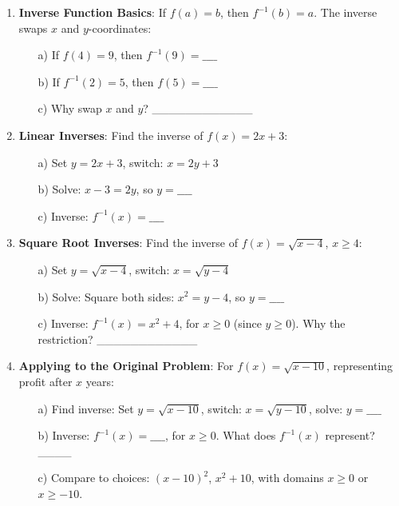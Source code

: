 \documentclass[12pt]{article}
\begin{document}
\begin{enumerate}[label=11.\arabic*]
    \item \textbf{Inverse Function Basics}: If \( f(a) = b \), then \( f^{-1}(b) = a \). The inverse swaps \( x \) and \( y \)-coordinates:
    \begin{enumerate}
        \item[a)] If \( f(4) = 9 \), then \( f^{-1}(9) = \_\_\_\_ \)
        \item[b)] If \( f^{-1}(2) = 5 \), then \( f(5) = \_\_\_\_ \)
        \item[c)] Why swap \( x \) and \( y \)? \_\_\_\_\_\_\_\_\_\_\_\_
    \end{enumerate}
    \item \textbf{Linear Inverses}: Find the inverse of \( f(x) = 2x + 3 \):
    \begin{enumerate}
        \item[a)] Set \( y = 2x + 3 \), switch: \( x = 2y + 3 \)
        \item[b)] Solve: \( x - 3 = 2y \), so \( y = \_\_\_\_ \)
        \item[c)] Inverse: \( f^{-1}(x) = \_\_\_\_ \)
    \end{enumerate}
    \item \textbf{Square Root Inverses}: Find the inverse of \( f(x) = \sqrt{x - 4} \), \( x \geq 4 \):
    \begin{enumerate}
        \item[a)] Set \( y = \sqrt{x - 4} \), switch: \( x = \sqrt{y - 4} \)
        \item[b)] Solve: Square both sides: \( x^2 = y - 4 \), so \( y = \_\_\_\_ \)
        \item[c)] Inverse: \( f^{-1}(x) = x^2 + 4 \), for \( x \geq 0 \) (since \( y \geq 0 \)). Why the restriction? \_\_\_\_\_\_\_\_\_\_\_\_
    \end{enumerate}
    \item \textbf{Applying to the Original Problem}: For \( f(x) = \sqrt{x - 10} \), representing profit after \( x \) years:
    \begin{enumerate}
        \item[a)] Find inverse: Set \( y = \sqrt{x - 10} \), switch: \( x = \sqrt{y - 10} \), solve: \( y = \_\_\_\_ \)
        \item[b)] Inverse: \( f^{-1}(x) = \_\_\_\_ \), for \( x \geq 0 \). What does \( f^{-1}(x) \) represent? \_\_\_\_
        \item[c)] Compare to choices: \( (x - 10)^2 \), \( x^2 + 10 \), with domains \( x \geq 0 \) or \( x \geq -10 \).
    \end{enumerate}
\end{enumerate}
\end{document}
